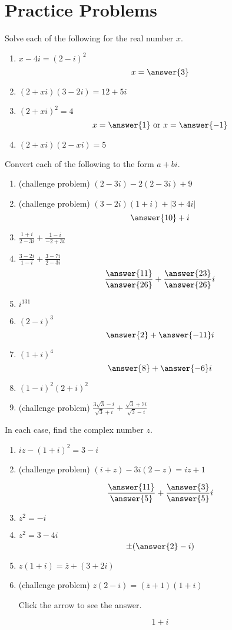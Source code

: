 \documentclass{ximera}
\begin{document}
\section*{Practice Problems}

\begin{problem}\label{prb:A.1}
Solve each of the following for the real number $x$.

\begin{enumerate}
\item $x-4i = (2-i)^2$
$$x=\answer{3}$$
\item $(2+xi)(3-2i) = 12+5i$
\item $(2+xi)^2=4$
$$x=\answer{1} \mbox{ or } x=\answer{-1}$$
\item $(2+xi)(2-xi)=5$
\end{enumerate}
\end{problem}

\begin{problem}\label{prb:A.2}
Convert each of the following to the form $a + bi$.

\begin{enumerate}
\item (challenge problem) $(2-3i)-2(2-3i)+9$
\item (challenge problem)  $(3-2i)(1+i)+|3+4i|$
$$\answer{10} + i$$
\item $\frac{1+i}{2-3i} + \frac{1-i}{-2+3i}$
\item $\frac{3-2i}{1-i} + \frac{3-7i}{2-3i}$
$$\frac{\answer{11}}{\answer{26}} + \frac{\answer{23}}{\answer{26}}i$$
\item $i^{131}$
\item $(2 - i)^{3}$
$$\answer{2} + \answer{-11}i$$
\item $(1 + i)^{4}$
$$\answer{8} +\answer{-6}i$$
\item $(1 - i)^{2}(2 + i)^{2}$
\item (challenge problem) $\frac{3\sqrt{3}-i}{\sqrt{3}+i} + \frac{\sqrt{3}+7i}{\sqrt{3}-i}$
\end{enumerate}
\end{problem}

\begin{problem}\label{prb:A.3}
In each case, find the complex number $z$.

\begin{enumerate}
\item $ iz - (1 + i)^{2} = 3 - i$
\item (challenge problem) $(i + z) - 3i(2 - z) = iz + 1$ 

$$\frac{\answer{11}}{\answer{5}} + \frac{\answer{3}}{\answer{5}}i$$

\item $z^{2} = -i$
\item $z^{2} = 3 - 4i$
$$\pm(\answer{2}-i)$$
\item $z(1+i) = \overline{z} + (3+2i)$
\item (challenge problem) $z(2-i) = (\overline{z}+1)(1+i)$

Click the arrow to see the answer.
\begin{expandable}
$$ 1 + i$$
\end{expandable}
\end{enumerate}
\end{problem}
\end{document}
